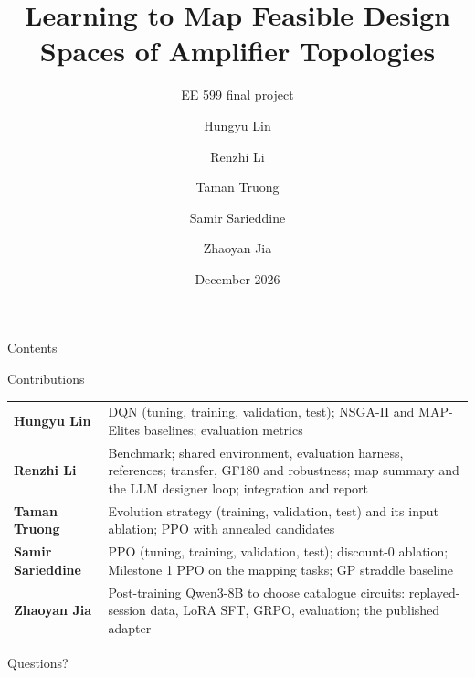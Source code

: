 \documentclass[aspectratio=169, 11pt]{beamer}
\title{Learning to Map Feasible Design Spaces of Amplifier Topologies}
\subtitle{EE 599 final project}
\author{Hungyu Lin \and Renzhi Li \and Taman Truong \and Samir Sarieddine \and Zhaoyan Jia}
\institute{University of Southern California}
\date{December 2026}
\begin{document}
\maketitle

\begin{frame}{Contents}
  \tableofcontents[hideallsubsections]
\end{frame}


\ifdefined\onlypart\else
\begin{frame}{Contributions}
  \small
  \renewcommand{\arraystretch}{1.35}
  \begin{tabular}{@{}p{}p{}@{}}
    \toprule
    \textbf{Hungyu Lin} & DQN (tuning, training, validation, test); NSGA-II and MAP-Elites baselines; evaluation metrics \\
    \textbf{Renzhi Li} & Benchmark; shared environment, evaluation harness, references; transfer, GF180 and robustness;
      map summary and the LLM designer loop; integration and report \\
    \textbf{Taman Truong} & Evolution strategy (training, validation, test) and its input ablation; PPO with annealed
      candidates \\
    \textbf{Samir Sarieddine} & PPO (tuning, training, validation, test); discount-0 ablation; Milestone 1 PPO on the
      mapping tasks; GP straddle baseline \\
    \textbf{Zhaoyan Jia} & Post-training Qwen3-8B to choose catalogue circuits: replayed-session data, LoRA SFT, GRPO,
      evaluation; the published adapter \\
    \bottomrule
  \end{tabular}
\end{frame}

\begin{frame}[standout]
  Questions?
\end{frame}
\fi

\appendix
{}
\end{document}
